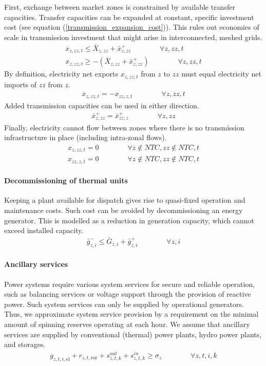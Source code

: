 \documentclass[11pt,a4paper]{article}
\begin{document}
First, exchange between market zones is constrained by available transfer capacities. Transfer capacities can be expanded at constant, specific investment cost (see equation (\ref{transmission_expansion_cost})). This rules out economies of scale in transmission investment that might arise in interconnected, meshed grids.
\begin{align}
x_{z,zz,t} \leq \bar{X}_{z,zz} + \bar{x}^{+}_{z,zz} \qquad \qquad \forall z, zz, t \\
x_{z,zz,t} \geq - \left( \bar{X}_{z,zz} + \bar{x}^{+}_{z,zz} \right) \qquad \qquad \forall z, zz, t
\end{align}
By definition, electricity net exports $x_{z,zz,t}$ from $z$ to $zz$ must equal electricity net imports of $zz$ from $z$.
\begin{align}
x_{z,zz,t} = -x_{zz,z,t} \qquad \qquad \forall z, zz, t
\end{align}
Added transmission capacities can be used in either direction.
\begin{align}
\bar{x}^{+}_{z,zz} = \bar{x}^{+}_{zz,z} \qquad \qquad \forall z, zz
\end{align}
Finally, electricity cannot flow between zones where there is no transmission infrastructure in place (including intra-zonal flows).
\begin{align}
x_{z,zz,t} = 0 \qquad \qquad \forall z \notin NTC, zz \notin NTC, t \\
x_{zz,z,t} = 0 \qquad \qquad \forall z \notin NTC, zz \notin NTC, t
\end{align}

\paragraph{Decommissioning of thermal units}
Keeping a plant available for dispatch gives rise to quasi-fixed operation and maintenance costs. 
Such cost can be avoided by decommissioning an energy generator. This is modelled as a reduction in generation capacity, which cannot exceed installed capacity.
\begin{align}
\bar{g}^{-}_{z,i} \leq \bar{G}_{z,i} + \bar{g}^{+}_{z,i} \qquad \qquad \forall z,i
\end{align}

\paragraph{Ancillary services}
Power systems require various system services for secure and reliable operation, such as balancing services or voltage support through the provision of reactive power. Such system services can only be supplied by operational generators. Thus, we approximate system service provision by a requirement on the minimal amount of spinning reserves operating at each hour. 
We assume that ancillary services are supplied by conventional (thermal) power plants, hydro power plants, and storages.
\begin{align}
g_{z,t,i,\text{el}} + r_{z,t,\text{ror}} + s^{out}_{z,t,k} + s^{in}_{z,t,k} \geq \sigma_{z} \qquad \qquad \forall z,t,i,k
\end{align}
\end{document}

